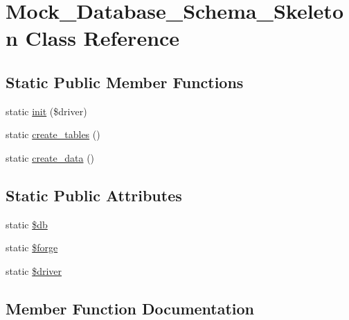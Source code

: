 \hypertarget{class_mock___database___schema___skeleton}{}\section{Mock\+\_\+\+Database\+\_\+\+Schema\+\_\+\+Skeleton Class Reference}
\label{class_mock___database___schema___skeleton}
\subsection*{Static Public Member Functions}
\begin{DoxyCompactItemize}
\item 
static \hyperlink{class_mock___database___schema___skeleton_abbc3801627f3912d61981952b3e65ad3}{init} (\$driver)
\item 
static \hyperlink{class_mock___database___schema___skeleton_abfce1fe171a8d45f40b25bb79350fc03}{create\+\_\+tables} ()
\item 
static \hyperlink{class_mock___database___schema___skeleton_a2648ff01c7e785cbf460ecfee449aa48}{create\+\_\+data} ()
\end{DoxyCompactItemize}
\subsection*{Static Public Attributes}
\begin{DoxyCompactItemize}
\item 
static \hyperlink{class_mock___database___schema___skeleton_a1fa3127fc82f96b1436d871ef02be319}{\$db}
\item 
static \hyperlink{class_mock___database___schema___skeleton_ae30bcdf49d65b81f7ce12940f2f14485}{\$forge}
\item 
static \hyperlink{class_mock___database___schema___skeleton_a142c9a24d4f80b32faeb93ca6e77f5e3}{\$driver}
\end{DoxyCompactItemize}


\subsection{Member Function Documentation}
\hypertarget{class_mock___database___schema___skeleton_a2648ff01c7e785cbf460ecfee449aa48}{}
